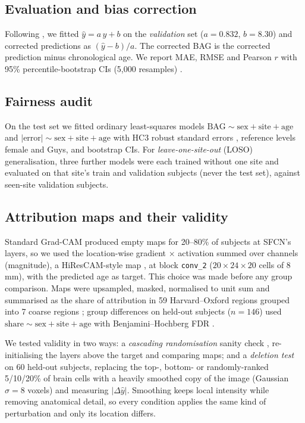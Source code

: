 \documentclass[conference]{IEEEtran}
\begin{document}
\subsection{Evaluation and bias correction}
Following \cite{cole2018mortality,delange2020correction}, we fitted $\hat{y}=a\,y+b$ on the \emph{validation} set ($a=0.832$, $b=8.30$) and corrected predictions as $(\hat{y}-b)/a$. The corrected BAG is the corrected prediction minus chronological age. We report MAE, RMSE and Pearson $r$ with 95\% percentile-bootstrap CIs (5,000 resamples) \cite{efron1993bootstrap}.

\subsection{Fairness audit}
On the test set we fitted ordinary least-squares models $\mathrm{BAG}\sim\mathrm{sex}+\mathrm{site}+\mathrm{age}$ and $|\mathrm{error}|\sim\mathrm{sex}+\mathrm{site}+\mathrm{age}$ with HC3 robust standard errors \cite{mackinnon1985hc}, reference levels female and Guys, and bootstrap CIs. For \emph{leave-one-site-out} (LOSO) generalisation, three further models were each trained without one site and evaluated on that site's train and validation subjects (never the test set), against seen-site validation subjects.

\subsection{Attribution maps and their validity}
Standard Grad-CAM \cite{selvaraju2017gradcam} produced empty maps for 20--80\% of subjects at SFCN's layers, so we used the location-wise gradient $\times$ activation summed over channels (magnitude), a HiResCAM-style map \cite{draelos2020hirescam}, at block \texttt{conv\_2} ($20\times24\times20$ cells of 8\,mm), with the predicted age as target. This choice was made before any group comparison. Maps were upsampled, masked, normalised to unit sum and summarised as the share of attribution in 59 Harvard--Oxford regions grouped into 7 coarse regions \cite{jenkinson2012fsl}; group differences on held-out subjects ($n=146$) used $\mathrm{share}\sim\mathrm{sex}+\mathrm{site}+\mathrm{age}$ with Benjamini--Hochberg FDR \cite{benjamini1995fdr}.

We tested validity in two ways: a \emph{cascading randomisation} sanity check \cite{adebayo2018sanity}, re-initialising the layers above the target and comparing maps; and a \emph{deletion test} \cite{samek2017evaluating,hooker2019benchmark} on 60 held-out subjects, replacing the top-, bottom- or randomly-ranked 5/10/20\% of brain cells with a heavily smoothed copy of the image (Gaussian $\sigma=8$ voxels) and measuring $|\Delta\hat{y}|$. Smoothing keeps local intensity while removing anatomical detail, so every condition applies the same kind of perturbation and only its location differs.
\end{document}
